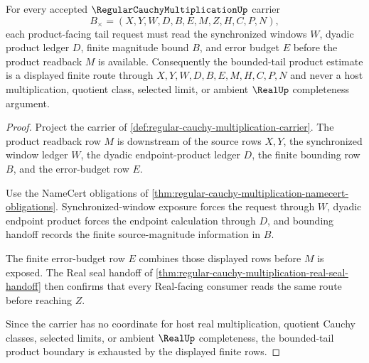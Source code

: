 \begin{theorem}
\label{thm:regular-cauchy-multiplication-tail-product-boundary}
For every accepted $\RegularCauchyMultiplicationUp$ carrier
$$
B_\times=(X,Y,W,D,B,E,M,Z,H,C,P,N),
$$
each product-facing tail request must read the synchronized windows $W$, dyadic product ledger $D$, finite magnitude bound $B$, and error budget $E$ before the product readback $M$ is available. Consequently the bounded-tail product estimate is a displayed finite route through $X,Y,W,D,B,E,M,H,C,P,N$ and never a host multiplication, quotient class, selected limit, or ambient $\RealUp$ completeness argument.
\end{theorem}
\begin{proof}
Project the carrier of \autoref{def:regular-cauchy-multiplication-carrier}. The product readback row $M$ is downstream of the source rows $X,Y$, the synchronized window ledger $W$, the dyadic endpoint-product ledger $D$, the finite bounding row $B$, and the error-budget row $E$.

Use the NameCert obligations of \autoref{thm:regular-cauchy-multiplication-namecert-obligations}. Synchronized-window exposure forces the request through $W$, dyadic endpoint product forces the endpoint calculation through $D$, and bounding handoff records the finite source-magnitude information in $B$.

The finite error-budget row $E$ combines those displayed rows before $M$ is exposed. The Real seal handoff of \autoref{thm:regular-cauchy-multiplication-real-seal-handoff} then confirms that every Real-facing consumer reads the same route before reaching $Z$.

Since the carrier has no coordinate for host real multiplication, quotient Cauchy classes, selected limits, or ambient $\RealUp$ completeness, the bounded-tail product boundary is exhausted by the displayed finite rows.
\end{proof}


